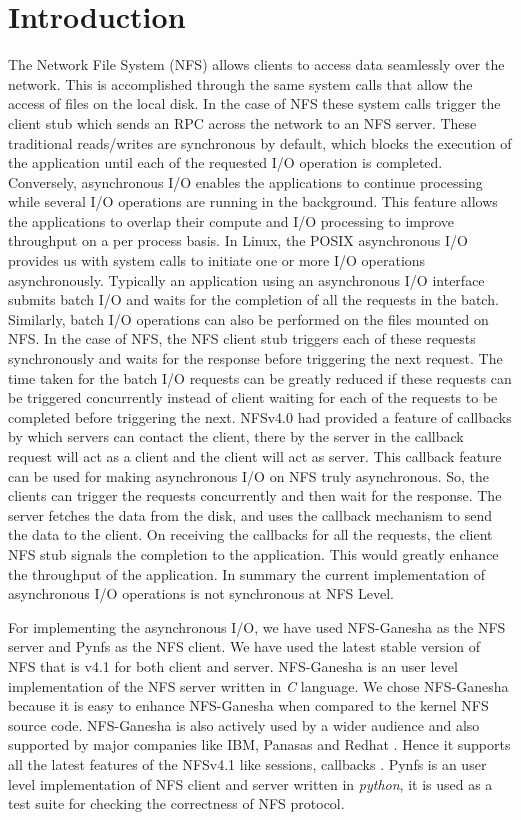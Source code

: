 \section{Introduction}
\label{sec:intro}

The Network File System (NFS) allows clients to access data seamlessly over the network. This is accomplished through the same system calls that allow the access of files on the local disk. In the case of NFS these system calls trigger the client stub which sends an RPC across the network to an NFS server. These traditional reads/writes are synchronous by default, which blocks the execution of the application until each of the requested I/O operation is completed. Conversely, asynchronous I/O enables the applications to continue processing while several I/O operations are running in the background. This feature allows the applications to overlap their compute and I/O processing to improve throughput on a per process basis. In Linux, the POSIX asynchronous I/O \cite{aio} provides us with system calls to initiate one or more I/O operations asynchronously. Typically an application using an asynchronous I/O interface submits batch I/O and waits for the completion of all the requests in the batch. Similarly, batch I/O operations can also be performed on the files mounted on NFS. In the case of NFS, the NFS client stub triggers each of these requests synchronously and waits for the response before triggering the next request. The time taken for the batch I/O requests can be greatly reduced if these requests can be triggered concurrently instead of client waiting for each of the requests to be completed before triggering the next. NFSv4.0 had provided a feature of callbacks by which servers can contact the client, there by the server in the callback request will act as a client and the client will act as server. This callback feature can be used for making  asynchronous I/O on NFS truly asynchronous. So, the clients can trigger the requests concurrently and then wait for the response. The server fetches the data from the disk, and uses the callback mechanism to send the data to the client. On receiving the callbacks for all the requests, the client NFS stub signals the completion to the  application. This would greatly enhance the throughput of the application. In summary the current implementation of asynchronous I/O operations is not synchronous at NFS Level.

For implementing the asynchronous I/O, we have used NFS-Ganesha \cite{ganesha} as the NFS server and Pynfs \cite{pynfs} as the NFS client. We have used the latest stable version of NFS that is v4.1 for both client and server. NFS-Ganesha is an user level implementation of the NFS server written in \textit{C} language. We chose NFS-Ganesha because it is easy to enhance NFS-Ganesha when compared to the kernel NFS source code. NFS-Ganesha is also actively used by a wider audience and also supported by major companies like IBM, Panasas and Redhat \cite{NFSGanesha}. Hence it supports all the latest features of the NFSv4.1 like sessions, callbacks \cite{NFSv41rfc}. Pynfs is an user level implementation of NFS client and server written in \textit{python}, it is used as a test suite for checking the correctness of NFS protocol.

